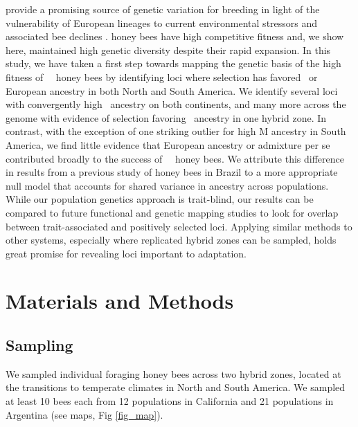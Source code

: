  provide a promising source of genetic variation for breeding in light of the vulnerability of European lineages to current environmental stressors and associated bee declines \cite{Goulson:2015er}.  honey bees have high competitive fitness and, we show here, maintained high genetic diversity despite their rapid expansion. In this study, we have taken a first step towards mapping the genetic basis of the high fitness of \africanized\ \hyb\ honey bees by identifying loci where selection has favored \scutellata\ or European ancestry in both North and South America. We identify several loci with convergently high \A\ ancestry on both continents, and many more across the genome with evidence of selection favoring \A\ ancestry in one hybrid zone. In contrast, with the exception of one striking outlier for high M ancestry in South America, we find little evidence that European ancestry or admixture per se contributed broadly to the success of \africanized\ \hyb\ honey bees.
We attribute this difference in results from a previous study of  honey bees in Brazil \cite{Nelson:2017cj} to a more appropriate null model that accounts for shared variance in ancestry across populations. While our population genetics approach is trait-blind, our results can be compared to future functional and genetic mapping studies to look for overlap between trait-associated and positively selected loci. Applying similar methods to other systems, especially where replicated hybrid zones can be sampled, holds great promise for revealing loci important to adaptation.


\section*{Materials and Methods}

\subsection*{Sampling}
We sampled individual foraging honey bees across two hybrid zones, located at the transitions to temperate climates in North and South America. We sampled at least 10 bees each from 12 populations in California and 21 populations in Argentina (see maps, Fig \ref{fig_map}).

